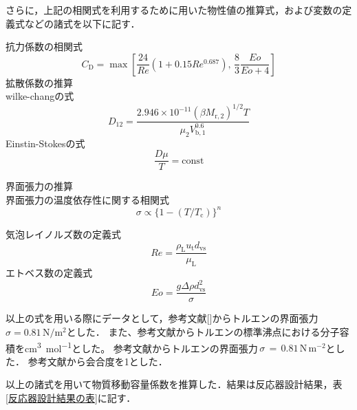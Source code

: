 \documentclass[a4j]{jsreport}
\begin{document}
さらに，上記の相関式を利用するために用いた物性値の推算式，および変数の定義式などの諸式を以下に記す．

抗力係数の相関式\cite{19952357}
\begin{equation}
    C_\mathrm{D} = \max \left[ \frac{24}{Re}(1+0.15Re^{0.687}), \, \frac{8}{3} \frac{Eo}{Eo+4} \right]
\end{equation}
拡散係数の推算\\
wilke-changの式\cite{化工便覧}
\begin{equation}
    D_{12} = \frac{2.946\times 10^{-11}(\beta M_{\mathrm{r,2}})^{1/2} T} {\mu_2 V_{\mathrm{b},1}^{0.6}}
\end{equation}
Einstin-Stokesの式\cite{実験テキスト}
\begin{equation}
    \frac{D \mu}{T} = \text{const}
\end{equation}

界面張力の推算\\
界面張力の温度依存性に関する相関式\cite{化工便覧}
\begin{equation}
    \sigma \propto \{ 1-(T/T_\mathrm{c}) \}^n
\end{equation}

気泡レイノルズ数の定義式\cite{19952357}
\begin{equation}
    Re = \frac{\rho_\mathrm{L}u_\mathrm{t} d_\mathrm{vs}}{\mu_\mathrm{L}}
\end{equation}
エトベス数の定義式\cite{19952357}
\begin{equation}
    Eo = \frac{g \varDelta \rho d_\mathrm{vs}^2}{\sigma}
\end{equation}

以上の式を用いる際にデータとして，参考文献[]からトルエンの界面張力$\sigma=0.81 \,\si{\newton \per \square \metre}$とした．
また、参考文献\cite{化工便覧}からトルエンの標準沸点における分子容積を\si{\cubic\centi\metre \mol^{-1}}とした。
参考文献\cite{界面張力}からトルエンの界面張力\,$\sigma\,=\,0.81\,\mathrm{ N\,m^{-2}}$とした．
参考文献\cite{TPP}から会合度を1とした．
\par
以上の諸式を用いて物質移動容量係数を推算した．結果は反応器設計結果，表\ref{反応器設計結果の表}に記す．
\end{document}
